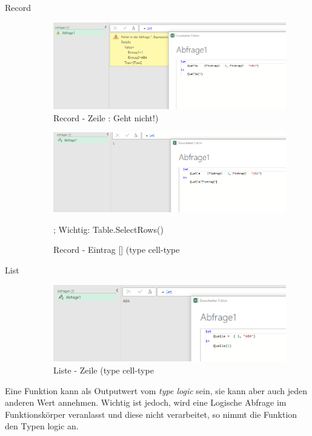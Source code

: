 \begin{description}
\begin{figure}[H]
\end{figure}
\item[Record]
\begin{figure}[H]
	\centering
	\includegraphics[scale = 0.3]{attachment/chapter_1/screenshot055}
	\caption{Record - Zeile ${}$: Geht nicht!)}
	\label{fig:screenshot055}
\end{figure}
\begin{figure}[H]
	\centering
	\includegraphics[scale = 0.3]{attachment/chapter_1/screenshot056}
	\caption{Record - Eintrag [] (type cell-type}; Wichtig: Table.SelectRows()
	\label{fig:screenshot056}
\end{figure}
\item[List]
\begin{figure}[H]
	\centering
	\includegraphics[scale = 0.3]{attachment/chapter_1/screenshot044}
	\caption{Liste - Zeile (type cell-type}
	\label{fig:screenshot0}
\end{figure}
\end{description}
Eine Funktion kann als Outputwert vom \textit{type logic} sein, sie kann aber auch jeden anderen Wert annehmen. Wichtig ist jedoch, wird eine Logische Abfrage im Funktionskörper veranlasst und diese nicht verarbeitet, so nimmt die Funktion den Typen logic an.\\

